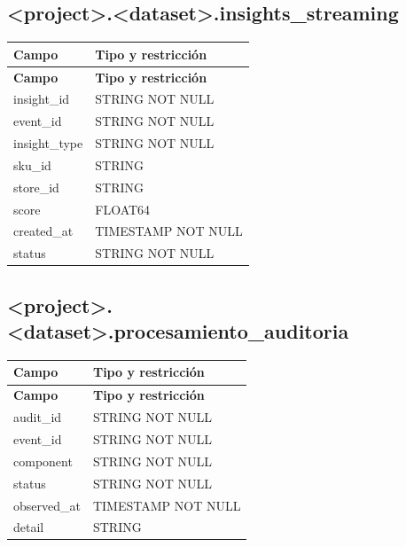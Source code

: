 \documentclass[11pt]{article}
\begin{document}
\subsection{<project>.<dataset>.insights\_\allowbreak{}streaming}

\begingroup\small
\begin{longtable}{@{}>{\raggedright\arraybackslash}p{}>{\raggedright\arraybackslash}p{}@{}}
\toprule
\textbf{Campo} & \textbf{Tipo y restricción} \\
\midrule
\endfirsthead
\toprule
\textbf{Campo} & \textbf{Tipo y restricción} \\
\midrule
\endhead
insight\_\allowbreak{}id & STRING NOT NULL \\
event\_\allowbreak{}id & STRING NOT NULL \\
insight\_\allowbreak{}type & STRING NOT NULL \\
sku\_\allowbreak{}id & STRING \\
store\_\allowbreak{}id & STRING \\
score & FLOAT64 \\
created\_\allowbreak{}at & TIMESTAMP NOT NULL \\
status & STRING NOT NULL \\
\bottomrule
\end{longtable}
\endgroup

\subsection{<project>.<dataset>.procesamiento\_\allowbreak{}auditoria}

\begingroup\small
\begin{longtable}{@{}>{\raggedright\arraybackslash}p{}>{\raggedright\arraybackslash}p{}@{}}
\toprule
\textbf{Campo} & \textbf{Tipo y restricción} \\
\midrule
\endfirsthead
\toprule
\textbf{Campo} & \textbf{Tipo y restricción} \\
\midrule
\endhead
audit\_\allowbreak{}id & STRING NOT NULL \\
event\_\allowbreak{}id & STRING NOT NULL \\
component & STRING NOT NULL \\
status & STRING NOT NULL \\
observed\_\allowbreak{}at & TIMESTAMP NOT NULL \\
detail & STRING \\
\bottomrule
\end{longtable}
\endgroup
\end{document}
